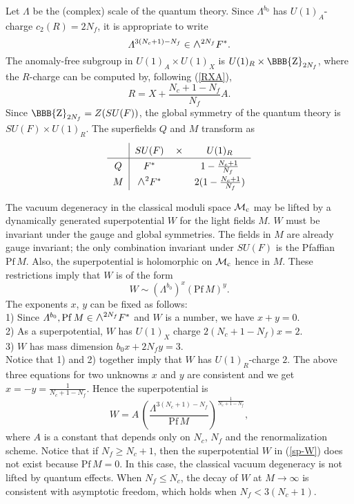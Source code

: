 \documentclass[lecture]{qft-l}
\newcommand{\Lam}{\varLambda}
\newcommand{\ZZ}{{\mbox{\BBB{Z}}}}
\newcommand{\medwedge}{\mbox{\fontsize{12pt}{0pt}\selectfont $\wedge$}}
\newcommand{\inv}[1]{\frac{1}{#1}}
\newcommand{\Pf}{\mathrm{Pf\,}}
\newcommand{\MM}{{\mathcal M}}
\newcommand{\MC}{\MM_{{\rm c}}}
\begin{document}
Let $\Lam$ be the (complex) scale of the quantum theory.
Since $\Lam^{b_0}$ has $U(1)_A$-charge $c_2(R)=2N_f$, it is appropriate to
write
	\begin{equation}\label{sp-Lam}
\Lam^{3(N_c+1)-N_f}\in\medwedge^{2N_f}F^*.
	\end{equation}
The anomaly-free subgroup in $U(1)_A\times U(1)_X$ is $U(1)_R\times\ZZ_{2N_f}$,
where the $R$-charge can be computed by, following (\ref{RXA}),
	\begin{equation}
R=X+\frac{N_c+1-N_f}{N_f}A.
	\end{equation}
Since $\ZZ_{2N_f}=Z(SU(F))$, the global symmetry of the quantum theory is 
$SU(F)\times U(1)_R$.
The superfields $Q$ and $M$ transform as
	\begin{equation}
\renewcommand{\arraystretch}{1.3}
	\begin{tabular}{c|ccc}
&   $SU(F)$	&$\times$&	$U(1)_R$		\\
\hline
$Q$	&   $F^*$	&	&  $1-\frac{N_c+1}{N_f}$	\\
$M$	& $\medwedge^2F^*$ &	&  $2(1-\frac{N_c+1}{N_f})$
\end{tabular}
\end{equation}

\medskip\noindent
The vacuum degeneracy in the classical moduli space $\MC$ may be lifted by
a dynamically generated superpotential $W$ for the light fields $M$.
$W$ must be invariant under the gauge and global symmetries.
The fields in $M$ are already gauge invariant; the only combination 
invariant under $SU(F)$ is the Pfaffian $\Pf M$.
Also, the superpotential is holomorphic on $\MC$ hence in $M$.
These restrictions imply that $W$ is of the form
	\begin{equation}
W\sim(\Lam^{b_0})^x(\Pf M)^y.
	\end{equation}
The exponents $x$, $y$ can be fixed as follows:\\
1) Since $\Lam^{b_0},\Pf M\in\medwedge^{2N_f}F^*$ and $W$ is 
a number, we have $x+y=0$.\\
2) As a superpotential, $W$ has $U(1)_X$ charge $2(N_c+1-N_f)x=2$.\\
3) $W$ has mass dimension $b_0x+2N_fy=3$.\\
Notice that 1) and 2) together imply that $W$ has $U(1)_R$-charge $2$.
The above three equations for two unknowns $x$ and $y$ are consistent
and we get $x=-y=\inv{N_c+1-N_f}$.
Hence the superpotential is
	\begin{equation}\label{sp-W}
W=A\,\left(\frac{\Lam^{3(N_c+1)-N_f}}{\Pf M}\right)^{\inv{N_c+1-N_f}},
	\end{equation}
where $A$ is a constant that depends only on $N_c$, $N_f$ and the
renormalization scheme.
Notice that if $N_f\ge N_c+1$, then the superpotential $W$ in (\ref{sp-W})
does not exist because $\Pf M=0$.
In this case, the classical vacuum degeneracy is not lifted by quantum effects.
When $N_f\le N_c$, the decay of $W$ at $M\to\infty$ is consistent with
asymptotic freedom, which holds when $N_f<3(N_c+1)$.
\end{document}
